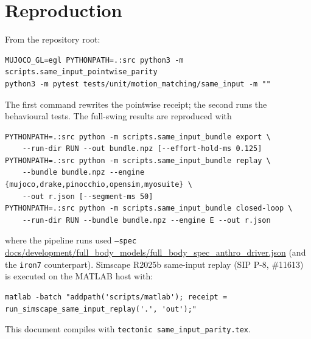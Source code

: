 \documentclass[11pt,a4paper]{article}
\begin{document}
\section{Reproduction}
From the repository root:
\begin{verbatim}
MUJOCO_GL=egl PYTHONPATH=.:src python3 -m scripts.same_input_pointwise_parity
python3 -m pytest tests/unit/motion_matching/same_input -m ""
\end{verbatim}
The first command rewrites the pointwise receipt; the second runs the
behavioural tests.  The full-swing results are reproduced with
\begin{verbatim}
PYTHONPATH=.:src python -m scripts.same_input_bundle export \
    --run-dir RUN --out bundle.npz [--effort-hold-ms 0.125]
PYTHONPATH=.:src python -m scripts.same_input_bundle replay \
    --bundle bundle.npz --engine {mujoco,drake,pinocchio,opensim,myosuite} \
    --out r.json [--segment-ms 50]
PYTHONPATH=.:src python -m scripts.same_input_bundle closed-loop \
    --run-dir RUN --bundle bundle.npz --engine E --out r.json
\end{verbatim}
where the pipeline runs used
\texttt{--spec} \url{docs/development/full_body_models/full_body_spec_anthro_driver.json} (and the \texttt{iron7} counterpart).
Simscape R2025b same-input replay (SIP P-8, \#11613) is executed on the MATLAB host with:
\begin{verbatim}
matlab -batch "addpath('scripts/matlab'); receipt = run_simscape_same_input_replay('.', 'out');"
\end{verbatim}
This document compiles with \texttt{tectonic same\_input\_parity.tex}.
\end{document}
